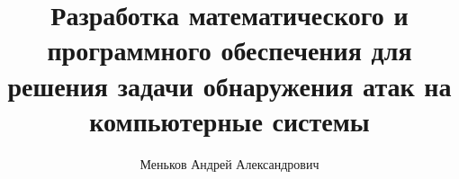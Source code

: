 \documentclass[12pt,a4paper]{article}
\author{Меньков Андрей Александрович}
\title{Разработка математического и программного обеспечения для решения задачи обнаружения атак на компьютерные системы}
\begin{document}
\renewcommand{\figurename}{Рисунок}
\renewcommand{\appendixname}{ПРИЛОЖЕНИЕ}




% 
\end{document}
